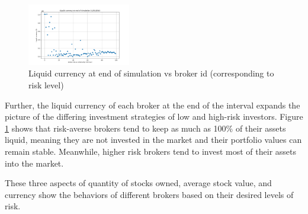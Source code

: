 \documentclass[letterpaper, 11 pt, proceedings]{IEEEtran}
\begin{document}
	


	\begin{figure}[h]
		\centering
		\includegraphics[width=0.4\textwidth]{liquidCurrency.png}
		\caption{Liquid currency at end of simulation vs broker id (corresponding to risk level)}
		\label{liquidvID}
	\end{figure}
	\FloatBarrier	

	Further, the liquid currency of each broker at the end of the interval expands the picture of the differing investment strategies of low and high-risk investors. Figure \ref{liquidvID} shows that risk-averse brokers tend to keep as much as 100\% of their assets liquid, meaning they are not invested in the market and their portfolio values can remain stable. Meanwhile, higher risk brokers tend to invest most of their assets into the market.
	
	These three aspects of quantity of stocks owned, average stock value, and currency show the behaviors of different brokers based on their desired levels of risk.
\end{document}
